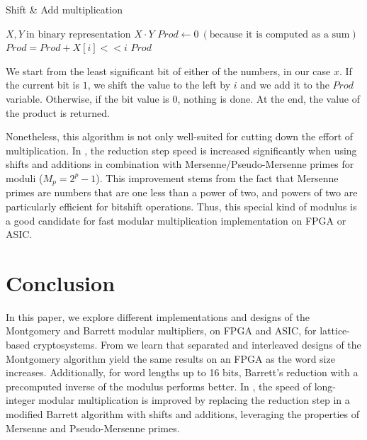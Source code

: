 \documentclass[11pt,
  titlepage=false,
  abstract=on,
]{scrreprt}
\begin{document}
\begin{algorithm}
  \caption{Shift \& Add multiplication}
  \label{alg:montgomery}
  \begin{algorithmic}[1]
  \REQUIRE \( X, Y\ \text{in binary representation}\)
  \renewcommand{\algorithmicensure}{\textbf{Output:}}
  \ENSURE \(X \cdot Y\)
  \STATE \( Prod \leftarrow 0\ (\text{because it is computed as a sum}) \)
          \STATE \( Prod = Prod + X[i] << i \)
      \ENDIF
  \ENDFOR
  \RETURN \( Prod \)
  \end{algorithmic}
\end{algorithm}

We start from the least significant bit of either of the numbers, in our case $x$. If the current bit is $1$, we shift the value to the left by $i$ and
we add it to the $Prod$ variable. Otherwise, if the bit value is 0, nothing is done. At the end, the value of the product is returned.

Nonetheless, this algorithm is not only well-suited for cutting down the effort of multiplication. In \cite{sreehari2012application}, the reduction step speed 
is increased significantly when using shifts and additions in combination with Mersenne/Pseudo-Mersenne primes for moduli ($M_p = 2^p - 1$). This improvement 
stems from the fact that Mersenne primes are numbers that are one less than a power of two, and powers of two are particularly efficient for bitshift operations. 
Thus, this special kind of modulus is a good candidate for fast modular multiplication implementation on FPGA or ASIC.
\section{Conclusion}
\label{sec:conclusion}
In this paper, we explore different implementations and designs of the Montgomery and Barrett modular multipliers, on FPGA and ASIC, for lattice-based cryptosystems.
From \cite{kong2006comparison} we learn that separated and interleaved designs of the Montgomery algorithm yield the same results on an FPGA as the word size increases.
Additionally, for word lengths up to 16 bits, Barrett's reduction with a precomputed inverse of the modulus performs better. In \cite{sreehari2012application}, the speed 
of long-integer modular multiplication is improved by replacing the reduction step in a modified Barrett algorithm with shifts and additions, leveraging the properties of 
Mersenne and Pseudo-Mersenne primes.
\end{document}
